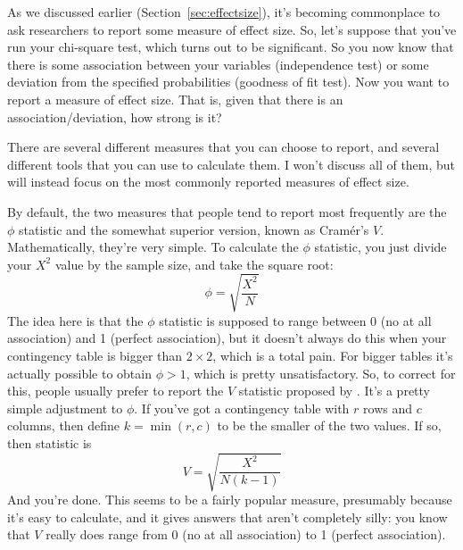 As we discussed earlier (Section~\ref{sec:effectsize}), it's becoming commonplace to ask researchers to report some measure of effect size. So, let's suppose that you've run your chi-square test, which turns out to be significant. So you now know that there is some association between your variables (independence test) or some deviation from the specified probabilities (goodness of fit test). Now you want to report a measure of effect size. That is, given that there is an association/deviation, how strong is it?

There are several different measures that you can choose to report, and several different tools that you can use to calculate them. I won't discuss all of them, but will instead focus on the most commonly reported measures of effect size. 

By default, the two measures that people tend to report most frequently are the $\phi$ statistic and the somewhat superior version, known as  Cram\'er's $V$. Mathematically, they're very simple. To calculate the $\phi$ statistic, you just divide your $X^2$ value by the sample size, and take the square root:
$$ 
\phi = \sqrt{\frac{X^2}{N}}
$$
The idea here is that the $\phi$ statistic is supposed to range between 0 (no at all association) and 1 (perfect association), but it doesn't always do this when your contingency table is bigger than $2 \times 2$, which is a total pain. For bigger tables it's actually possible to obtain $\phi>1$, which is pretty unsatisfactory. So, to correct for this, people usually prefer to report the $V$ statistic proposed by . It's a pretty simple adjustment to $\phi$. If you've got a contingency table with $r$ rows and $c$ columns, then define $k = \min(r,c)$ to be the smaller of the two values. If so, then  statistic is
$$
V = \sqrt{\frac{X^2}{N(k-1)}}
$$
And you're done. This seems to be a fairly popular measure, presumably because it's easy to calculate, and it gives answers that aren't completely silly: you know that $V$ really does range from 0 (no at all association) to 1 (perfect association). 

